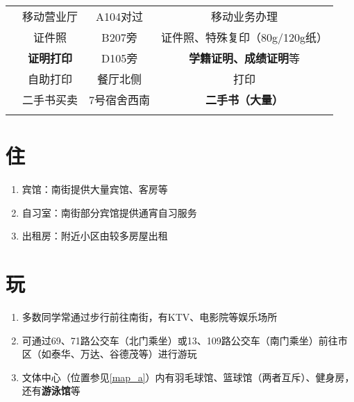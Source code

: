 \begin{table}[!ht]
\begin{tabular}{|c|c|c|c|}
                              & 移动营业厅              & A104对过 & 移动业务办理                    \\
        \Xhline{1.2pt}
        \multirow{4}{*}{其他}   & 证件照                & B207旁  & 证件照、特殊复印（80g/120g纸）       \\
        \cline{2-4}
                              & \textbf{证明打印}      & D105旁  & \textbf{学籍证明、成绩证明}等       \\
        \cline{2-4}
                              & 自助打印               & 餐厅北侧   & 打印                        \\
        \cline{2-4}
                              & 二手书买卖              & 7号宿舍西南 & \textbf{二手书（大量）}          \\
        \Xhline{1.2pt}
    \end{tabular}
\end{table}

\section[住]{住}
\begin{enumerate}
    \item 宾馆：南街提供大量宾馆、客房等
    \item 自习室：南街部分宾馆提供通宵自习服务
    \item 出租房：附近小区由较多房屋出租\footnotemark
\end{enumerate}

\section[玩]{玩}
\begin{enumerate}
    \item 多数同学常通过步行前往南街，有KTV、电影院等娱乐场所
    \item 可通过69、71路公交车（北门乘坐）或13、109路公交车（南门乘坐）前往市区（如泰华、万达、谷德茂等）进行游玩
    \item 文体中心（位置参见\uline{\ref{map_a}}）内有羽毛球馆、篮球馆（两者互斥）、健身房，还有\textbf{游泳馆}等\footnotemark
\end{enumerate}